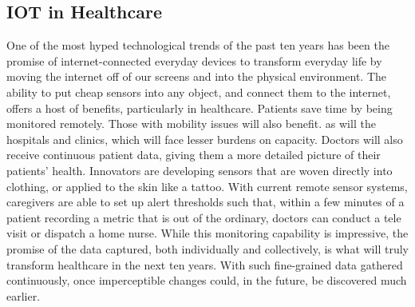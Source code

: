 \documentclass[12pt]{article}
\begin{document}
\subsection{IOT in Healthcare}
One of the most hyped technological trends of the past ten years has been the promise of internet-connected everyday devices to transform everyday life by moving the internet off of our screens and into the physical environment.\newline
The ability to put cheap sensors into any object, and connect them to the internet, offers a host of benefits, particularly in healthcare. Patients save time by being monitored remotely. Those with mobility issues will also benefit. as will the hospitals and clinics, which will face lesser burdens on capacity. Doctors will also receive continuous patient data, giving them a more detailed picture of their patients' health.\newline
 Innovators are developing sensors that are woven directly into clothing, or applied to the skin like a tattoo. With current remote sensor systems, caregivers are able to set up alert thresholds such that, within a few minutes of a patient recording a metric that is out of the ordinary, doctors can conduct a tele visit or dispatch a home nurse.
While this monitoring capability is impressive, the promise of the data captured, both individually and collectively, is what will truly transform healthcare in the next ten years. With such fine-grained data gathered continuously, once imperceptible changes could, in the future, be discovered much earlier.
\end{document}
